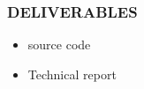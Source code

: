 \documentclass[letterpaper,12pt]{article}
\begin{document}
\subsubsection*{DELIVERABLES}
\begin{itemize}
 \item source code
 \item Technical report
\end{itemize}
% 
% 
% 
% 
% 
% 
% 
% 
% 
% 
% 
\end{document}
